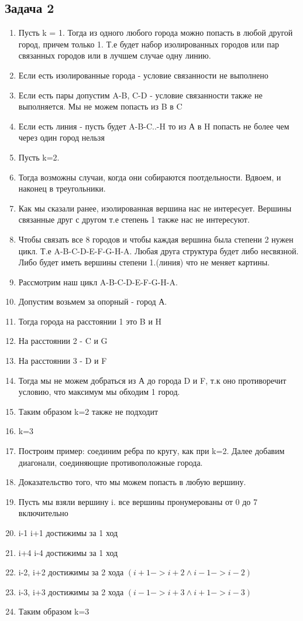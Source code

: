 \documentclass[a4paper,12pt]{article}
\begin{document}
\subsection{Задача 2}
\begin{enumerate}
    \item Пусть k = 1. Тогда из одного любого города можно попасть в любой другой город, причем только 1. Т.е будет набор изолированных городов или пар связанных городов  или в лучшем случае одну линию.
    \item Если есть изолированные города - условие связанности не выполнено
    \item Если есть пары допустим A-B, C-D - условие связанности также не выполняется. Мы не можем попасть из B в C
    \item Если есть линия - пусть будет A-B-C..-H то из А в H попасть не более чем через один город нельзя
    \item Пусть k=2. 
    \item Тогда возможны случаи, когда они собираются поотдельности. Вдвоем, и наконец в треугольники.
    \item Как мы сказали ранее, изолированная вершина нас не интересует. Вершины связанные друг с другом т.е степень 1 также нас не интересуют.
    \item Чтобы связать все 8 городов и чтобы каждая вершина была степени 2 нужен цикл. Т.е A-B-C-D-E-F-G-H-A. Любая друга структура будет либо несвязной. Либо будет иметь вершины степени 1.(линия) что не меняет картины.
    \item Рассмотрим наш цикл A-B-C-D-E-F-G-H-A.
    \item Допустим возьмем за опорный - город А.
    \item Тогда города на расстоянии 1 это B и H
    \item На расстоянии 2 - C и G
    \item На расстоянии 3 - D и F
    \item Тогда мы не можем добраться из А до города D и F, т.к оно противоречит условию, что максимум мы обходим 1 город.
    \item Таким образом k=2  также не подходит
    \item k=3
    \item Построим пример: соединим ребра по кругу, как при k=2. Далее добавим диагонали, соединяющие противоположные города.
    \item Доказательство того, что мы можем попасть в любую вершину.
    \item Пусть мы взяли вершину i. все вершины пронумерованы от 0 до 7 включительно
    \item i-1 i+1 достижимы за 1 ход
    \item i+4 i-4 достижимы за 1 ход
    \item i-2, i+2 достижимы за 2 хода $(i+1->i+2 \land i-1 -> i-2)$
    \item i-3, i+3 достижимы за 2 хода $(i-1 -> i+3 \land i+1 ->i-3)$
    \item Таким образом k=3
\end{enumerate}
\end{document}
